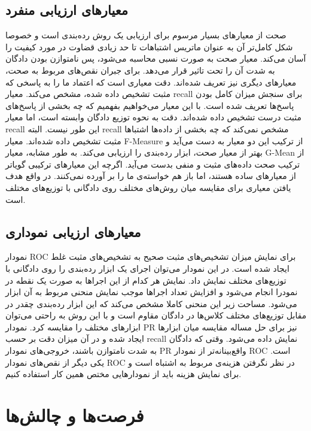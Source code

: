 \documentclass{article}
\begin{document}
\subsection{معیارهای ارزیابی منفرد}
صحت از معیارهای بسیار مرسوم برای ارزیابی یک روش رده‌بندی است و خصوصا شکل کامل‌تر آن به عنوان ماتریس اشتباهات تا حد زیادی قضاوت در مورد کیفیت را آسان می‌کند. معیار صحت به صورت نسبی محاسبه می‌شود، پس نامتوازن بودن دادگان به شدت آن را تحت تاثیر قرار می‌دهد.
برای جبران نقص‌های مربوط به صحت، معیارهای دیگری نیز تعریف شده‌اند. دقت معیاری است که اعتماد ما را به پاسخی که مثبت تشخیص داده شده، مشخص می‌کند. معیار recall برای سنجش میزان کامل بودن پاسخ‌ها تعریف شده است. با این معیار می‌خواهیم بفهمیم که چه بخشی از پاسخ‌های مثبت درست تشخیص داده شده‌اند. دقت به نحوه توزیع دادگان وابسته است، اما معیار recall این طور نیست. البته recall مشخص نمی‌کند که چه بخشی از داده‌ها اشتباها مثبت تشخیص داده شده‌اند. معیار F-Measure از ترکیب این دو معیار به دست می‌آید و بهتر از معیار صحت، ابزار رده‌بندی را ارزیابی می‌کند. به طور مشابه، معیار G-Mean از ترکیب صحت داده‌های مثبت و منفی بدست می‌آید. اگرچه این معیارهای ترکیبی گویاتر از معیارهای ساده هستند، اما باز هم خواسته‌ی ما را بر آورده نمی‌کنند. در واقع هدف یافتن معیاری برای مقایسه میان روش‌های مختلف روی دادگانی با توزیع‌های مختلف است.

\subsection{معیارهای ارزیابی نموداری}
نمودار ROC برای نمایش میزان تشخیص‌های مثبت صحیح به تشخیص‌های مثبت غلط ایجاد شده است. در این نمودار می‌توان اجرای یک ابزار رده‌بندی را روی دادگانی با توزیع‌های مختلف نمایش داد. نمایش هر کدام از این اجراها به صورت یک نقطه در نمودرا انجام می‌شود و افزایش تعداد اجراها موجب نمایش منحنی مربوط به آن ابزار می‌شود. مساحت زیر این منحنی کاملا مشخص می‌کند که این ابزار رده‌بندی چقدر در مقابل توزیع‌های مختلف کلاس‌ها در دادگان مقاوم است و با این روش به راحتی می‌توان ابزارهای مختلف را مقایسه کرد. نمودار PR نیز برای حل مساله مقایسه میان ابزارها ایجاد شده و در آن میزان دقت بر حسب recall نمایش داده می‌شود. وقتی که دادگان به شدت نامتوازن باشند، خروجی‌های نمودار PR واقع‌بینانه‌تر از نمودار ROC است. یکی دیگر از نقص‌های نمودار ROC در نظر نگرفتن هزینه‌ی مربوط به اشتباه است و برای نمایش هزینه باید از نمودارهایی مختص همین کار استفاده کنیم.

\section{فرصت‌ها و چالش‌ها}
\end{document}

